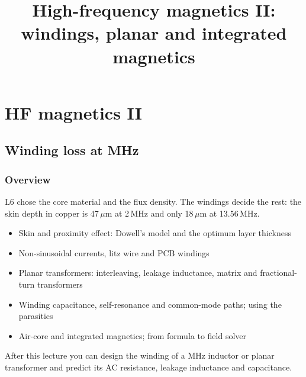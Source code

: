 \title[HF magnetics II]{High-frequency magnetics II: windings, planar and integrated magnetics}
\section{HF magnetics II}

\begin{frame}[plain]
	\titlepage
\end{frame}

\subsection{Winding loss at MHz}

\begin{frame}
	\frametitle{Overview}
	L6 chose the core material and the flux density. The windings decide the rest: the skin depth in copper is 47\,$\mu$m at 2\,MHz and only 18\,$\mu$m at 13.56\,MHz.
	\begin{itemize}
		\item Skin and proximity effect: Dowell's model and the optimum layer thickness
		\item Non-sinusoidal currents, litz wire and PCB windings
		\item Planar transformers: interleaving, leakage inductance, matrix and fractional-turn transformers
		\item Winding capacitance, self-resonance and common-mode paths; using the parasitics
		\item Air-core and integrated magnetics; from formula to field solver
	\end{itemize}
	After this lecture you can design the winding of a MHz inductor or planar transformer and predict its AC resistance, leakage inductance and capacitance.
\end{frame}

